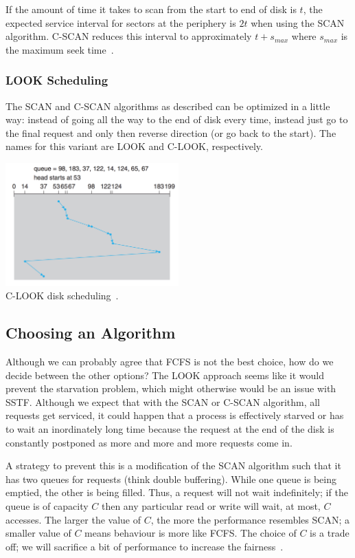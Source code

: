 If the amount of time it takes to scan from the start to end of disk is $t$, the expected service interval for sectors at the periphery is $2t$ when using the SCAN algorithm. C-SCAN reduces this interval to approximately $t + s_{max}$ where $s_{max}$ is the maximum seek time~\cite{osi}.


\subsubsection*{LOOK Scheduling}
The SCAN and C-SCAN algorithms as described can be optimized in a little way: instead of going all the way to the end of disk every time, instead just go to the final request and only then reverse direction (or go back to the start). The names for this variant are LOOK and C-LOOK, respectively. 

\begin{center}
	\includegraphics[width=0.5\textwidth]{images/disk-clook.png}\\
	C-LOOK disk scheduling~\cite{osc}.
\end{center}



\subsection*{Choosing an Algorithm}

Although we can probably agree that FCFS is not the best choice, how do we decide between the other options? The LOOK approach seems like it would prevent the starvation problem, which might otherwise would be an issue with SSTF. Although we expect that with the SCAN or C-SCAN algorithm, all requests get serviced, it could happen that a process is effectively starved or has to wait an inordinately long time because the request at the end of the disk is constantly postponed as more and more and more requests come in. 

A strategy to prevent this is a modification of the SCAN algorithm such that it has two queues for requests (think double buffering). While one queue is being emptied, the other is being filled. Thus, a request will not wait indefinitely; if the queue is of capacity $C$ then any particular read or write will wait, at most, $C$ accesses. The larger the value of $C$, the more the performance resembles SCAN; a smaller value of $C$ means behaviour is more like FCFS. The choice of $C$ is a trade off; we will sacrifice a bit of performance to increase the fairness~\cite{osi}.

